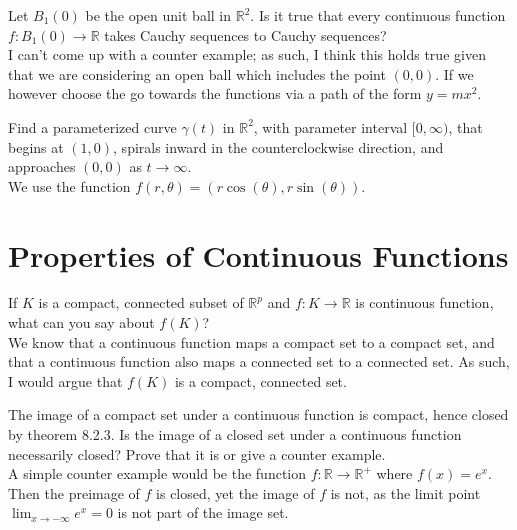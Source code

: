 \documentclass[12pt]{book}
\newcommand{\R}{\mathbb{R}}
\newenvironment{exercise}[2][Exercise]{\begin{trivlist}
\item[\hskip \labelsep {\bfseries #1}\hskip \labelsep {\bfseries #2.}]}{\end{trivlist}}
\begin{document}
\begin{exercise}{7.2.7}
\begin{exercise}{8.1.12}
Let $B_1(0)$ be the open unit ball in $\R^2$. Is it true that every continuous function $f:B_1(0) \to \R$ takes Cauchy sequences to Cauchy sequences? \\

I can't come up with a counter example; as such, I think this holds true given that we are considering an open ball which includes the point $(0,0)$. If we however choose the go towards the functions via a path of the form $y = m x^2$.
\end{exercise}


\begin{exercise}{8.1.14}
Find a parameterized curve $\gamma(t)$ in $\R^2$, with parameter interval $[0, \infty)$, that begins at $(1,0)$, spirals inward in the counterclockwise direction, and approaches $(0,0)$ as $t \to \infty$. \\

We use the function $f(r,\theta) = \left( r \cos(\theta), r \sin(\theta) \right)$.
\end{exercise}




\section{Properties of Continuous Functions}


\begin{exercise}{8.2.3}
If $K$ is a compact, connected subset of $\R^p$ and $f:K \to \R$ is continuous function, what can you say about $f(K)$? \\

We know that a continuous function maps a compact set to a compact set, and that a continuous function also maps a connected set to a connected set. As such, I would argue that $f(K)$ is a compact, connected set.
\end{exercise}



\begin{exercise}{8.2.5}
The image of a compact set under a continuous function is compact, hence closed by theorem 8.2.3. Is the image of a closed set under a continuous function necessarily closed? Prove that it is or give a counter example.  \\

A simple counter example would be the function $f:\R \to \R^+$ where $f(x) = e^x$. Then the preimage of $f$ is closed, yet the image of $f$ is not, as the limit point $\lim_{x \to -\infty} e^x = 0$ is not part of the image set.
\end{exercise}




\end{exercise}
\end{document}
